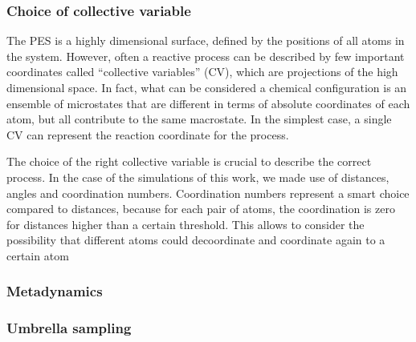 \subsubsection*{Choice of collective variable}
The PES is a highly dimensional surface, defined by the positions of all atoms in the system. However, often a reactive process can be described by few important coordinates called ``collective variables'' (CV), which are projections of the high dimensional space. In fact, what can be considered a chemical configuration is an ensemble of microstates that are different in terms of absolute coordinates of each atom, but all contribute to the same macrostate.
In the simplest case, a single CV can represent the reaction coordinate for the process.

The choice of the right collective variable is crucial to describe the correct process. In the case of the simulations of this work, we made use of distances, angles and coordination numbers. Coordination numbers represent a smart choice compared to distances, because for each pair of atoms, the coordination is zero for distances higher than a certain threshold. This allows to consider the possibility that different atoms could decoordinate and coordinate again to a certain atom 



\subsubsection*{Metadynamics}



\subsubsection*{Umbrella sampling}



\clearpage{\pagestyle{empty}\cleardoublepage}


